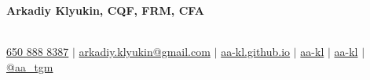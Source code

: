 \documentclass[letterpaper,hidelinks]{article}
\begin{document}


\begin{center}
  \textbf{\Huge{Arkadiy Klyukin, CQF, FRM, CFA}\\} \\ \vspace{1pt}
 
  \small
  \faMobile* \hspace{.5pt} \href{tel:+16508888387}{650 888 8387}
  $|$
  \faAt \hspace{.5pt} \href{mailto:arkadiy.klyukin@gmail.com}{arkadiy.klyukin@gmail.com}
  $|$
  \faGlobeAmericas \hspace{.5pt} \href{https://aa-kl.github.io}{aa-kl.github.io}
  $|$
  \faGithub \hspace{.5pt} \href{https://github.com/aa-kl}{aa-kl}
  $|$
  \faLinkedinIn \hspace{.5pt} \href{https://www.linkedin.com/in/aa-kl}{aa-kl}
  $|$
  \faTelegramPlane \hspace{.5pt} \href{https://t.me/aa_tgm}{@aa\_tgm}
\end{center}



\vspace{-27pt}
\end{document}
